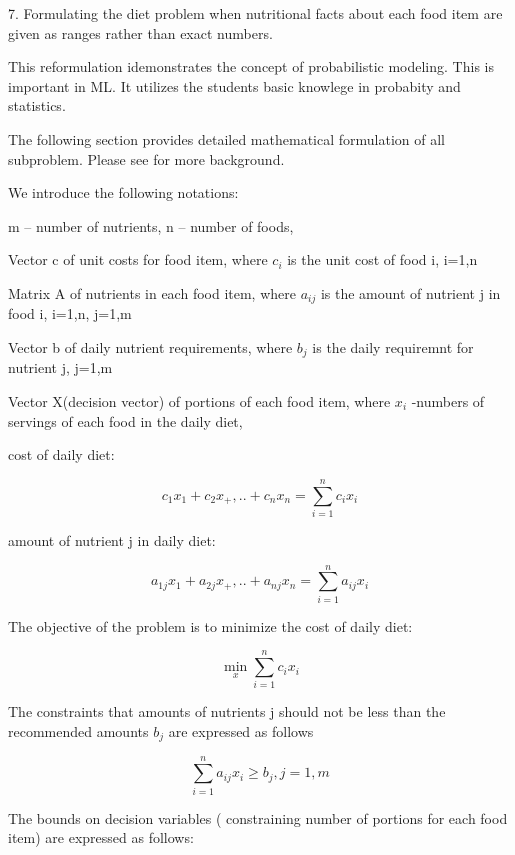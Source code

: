 7. Formulating the diet problem when nutritional facts about each food item are given as ranges rather than exact numbers.

This reformulation idemonstrates the concept of probabilistic modeling. This is important in ML. It utilizes the students basic knowlege in probabity and statistics.

The following section provides detailed mathematical formulation of all subproblem. Please see \cite{RV} for more background.

We introduce the following notations:

m – number of nutrients, n – number of foods, 

Vector c of unit costs for food item, where  $c_i$ is the unit cost of food i, i=1,n

Matrix A of nutrients in each food item, where  $a_{ij}$ is the amount of nutrient j in food i, i=1,n, j=1,m

Vector b  of daily nutrient requirements, where $b_j$ is the daily  requiremnt for nutrient j, j=1,m

Vector X(decision vector)  of portions of each food item, where $x_i$ -numbers of servings of each food in the daily diet, 


cost of daily diet:

    \begin{equation} 
    c_1x_1+c_2x_+,..+ c_nx_n=\sum_{i=1}^{n}{c_ix_i}
    \end{equation}

amount of nutrient j in daily diet:

    \begin{equation} 
    a_{1j}x_1+a_{2j}x_+,..+ a_{nj}x_n=\sum_{i=1}^{n}{a_{ij}x_i}
    \end{equation}

The objective of the problem is to minimize the cost of daily diet:

    \begin{equation}
   \min_x \sum_{i=1}^{n}{c_ix_i}
    \end{equation}

The constraints that amounts of nutrients j should not be less than the recommended amounts $b_j$ are expressed as follows

   \begin{equation}
    \sum_{i=1}^{n}{a_{ij}x_i}\ge b_j, j=1,m
    \end{equation}

The bounds on decision variables ( constraining number of portions for each food item) are expressed as follows:

